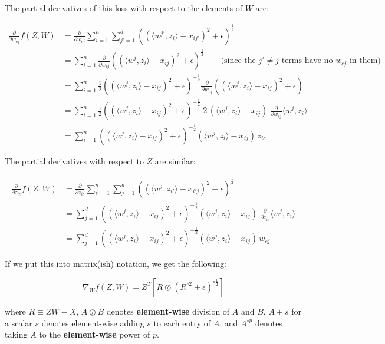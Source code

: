 \documentclass{article}
\begin{document}
The partial derivatives of this loss with respect to the elements of $W$ are:

\begin{align*}
\frac{\partial}{\partial w_{cj}} f(Z,W)
  &= \frac{\partial}{\partial w_{cj}} \sum_{i=1}^n\sum_{j'=1}^d \left( (\langle w^{j'}, z_i\rangle - x_{ij'})^2 + \epsilon \right)^{\frac12} \\
  &= \sum_{i=1}^n \frac{\partial}{\partial w_{cj}} \left( (\langle w^{j}, z_i\rangle - x_{ij})^2 + \epsilon \right)^{\frac12}  \qquad \text{(since the $j' \ne j$ terms have no $w_{cj}$ in them)} \\
  &= \sum_{i=1}^n \frac12 \left( (\langle w^{j}, z_i\rangle - x_{ij})^2 + \epsilon \right)^{-\frac12} \frac{\partial}{\partial w_{cj}} \left( (\langle w^{j}, z_i\rangle - x_{ij})^2 + \epsilon \right) \\
  &= \sum_{i=1}^n \frac12  \left( (\langle w^{j}, z_i\rangle - x_{ij})^2 + \epsilon \right)^{-\frac12} \;2\,  (\langle w^{j}, z_i\rangle - x_{ij}) \; \frac{\partial}{\partial w_{cj}} \langle w^{j}, z_i\rangle \\
  &= \sum_{i=1}^n \left( (\langle w^{j}, z_i\rangle - x_{ij})^2 + \epsilon \right)^{-\frac12}  (\langle w^j, z_i\rangle - x_{ij}) \, z_{ic}
\end{align*}

The partial derivatives with respect to $Z$ are similar:

\begin{align*}
\frac{\partial}{\partial z_{ic}} f(Z,W)
  &= \frac{\partial}{\partial z_{ic}} \sum_{i'=1}^n \sum_{j=1}^d  \left( (\langle w^j, z_{i'}\rangle - x_{i'j})^2 + \epsilon \right)^{\frac12}\\
  &= \sum_{j=1}^d  \left( (\langle w^j, z_{i}\rangle - x_{ij})^2 + \epsilon \right)^{-\frac12}   (\langle w^j, z_{i}\rangle - x_{ij}) \; \frac{\partial}{\partial z_{ic}} \langle w^j, z_i\rangle \\
  &= \sum_{j=1}^d  \left( (\langle w^j, z_i\rangle - x_{ij})^2 + \epsilon \right)^{-\frac12}  (\langle w^j, z_i\rangle - x_{ij}) \, w_{cj}
\end{align*}

If we put this into matrix(ish) notation, we get the following:

\[
\nabla_W f(Z,W) = Z^T \left[ R \oslash \left(R^{\circ 2} + \epsilon\right)^{\circ \frac12}  \right]
\]

where $R\equiv ZW-X$,
$A \oslash B$ denotes \textbf{element-wise} division of $A$ and $B$,
$A + s$ for a scalar $s$ denotes element-wise adding $s$ to each entry of $A$,
and $A^{\circ p}$ denotes taking $A$ to the \textbf{element-wise} power of $p$.
\end{document}
